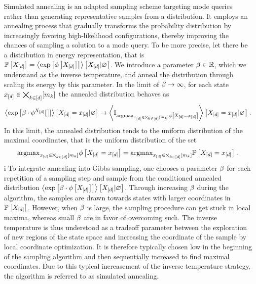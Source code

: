 Simulated annealing is an adapted sampling scheme targeting mode queries rather than generating representative samples from a distribution.
It employs an annealing process that gradually transforms the probability distribution by increasingly favoring high-likelihood configurations, thereby improving the chances of sampling a solution to a mode query.
To be more precise, let there be a distribution in energy representation, that is $\mathbb{P}\left[X_{[d]}\right]=\left\langle \mathrm{exp}\left[\phi\left[X_{[d]}\right]\right]\right\rangle \left[ X_{[d]} | \varnothing \right]$.
We introduce a parameter $\beta\in\mathbb{R}$, which we understand as the inverse temperature, and anneal the distribution through scaling its energy by this parameter.
In the limit of $\beta\rightarrow\infty$, for each state $x_{[d]}\in\bigtimes_{k\in[d]}[m_{k}]$ the annealed distribution behaves as
\begin{align*}
    \left\langle \mathrm{exp}\left[\beta\cdot\phi^{X_{[d]}}[\right]]\right\rangle \left[ X_{[d]}=x_{[d]} | \varnothing \right] \rightarrow
    \left\langle \mathbb{I}_{\mathrm{argmax}_{x_{[d]}\in\bigtimes_{k\in[d]}[m_{k}]}\phi\left[X_{[d]}=x_{[d]}\right]}\right\rangle \left[ X_{[d]}=x_{[d]} | \varnothing \right] \, .
\end{align*}
In this limit, the annealed distribution tends to the uniform distribution of the maximal coordinates, that is the uniform distribution of the set
\begin{align*}
    \mathrm{argmax}_{x_{[d]}\in\bigtimes_{k\in[d]}[m_{k}]}\phi\left[X_{[d]}=x_{[d]}\right] = \mathrm{argmax}_{x_{[d]}\in\bigtimes_{k\in[d]}[m_{k}]}\mathbb{P}\left[X_{[d]}=x_{[d]}\right] \, .
\end{align*}
i
To integrate annealing into Gibbs sampling, one chooses a parameter $\beta$ for each repetition of a sampling step and sample from the conditioned annealed distribution $\left\langle \mathrm{exp}\left[\beta\cdot\phi\left[X_{[d]}\right]\right]\right\rangle \left[ X_{[d]} | \varnothing \right]$.
Through increasing $\beta$ during the algorithm, the samples are drawn towards states with larger coordinates in $\mathbb{P}\left[X_{[d]}\right]$.
However, when $\beta$ is large, the sampling procedure can get stuck in local maxima, whereas small $\beta$ are in favor of overcoming such.
The inverse temperature is thus understood as a tradeoff parameter between the exploration of new regions of the state space and increasing the coordinate of the sample by local coordinate optimization.
It is therefore typically chosen low in the beginning of the sampling algorithm and then sequentially increased to find maximal coordinates.
Due to this typical increasement of the inverse temperature strategy, the algorithm is referred to as simulated annealing.


